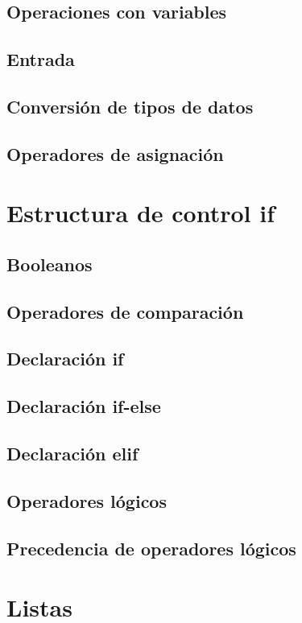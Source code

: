 \documentclass{article}
\begin{document}
      \subsection{Operaciones con variables}
      \subsection{Entrada}
      \subsection{Conversión de tipos de datos}
      \subsection{Operadores de asignación}
    
    \section{Estructura de control if}

      \subsection{Booleanos}
      \subsection{Operadores de comparación}
      \subsection{Declaración if}
      \subsection{Declaración if-else}
      \subsection{Declaración elif}
      \subsection{Operadores lógicos}
      \subsection{Precedencia de operadores lógicos}

    \section{Listas}
\end{document}
